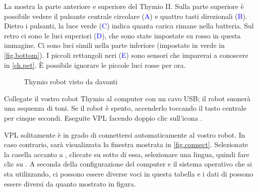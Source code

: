 
\label{ch.intro}


La  mostra la parte anteriore e superiore del Thymio II. Sulla parte superiore
è possibile vedere il pulsante centrale circolare (\textcolor{blue}{A}) e quattro tasti direzionali (\textcolor{blue}{B}).
Dietro i pulsanti, la luce verde (\textcolor{blue}{C}) indica quanta carica rimane nella
batteria. Sul retro ci sono le luci superiori (\textcolor{blue}{D}), che sono state impostate su rosso in questa immagine.
Ci sono luci simili nella parte inferiore (impostate in verde in \cref{fig.bottom}).
I piccoli rettangoli neri (\textcolor{blue}{E}) sono sensori che
imparerai a conoscere in \cref{ch.pet}. È possibile ignorare le piccole
luci rosse per ora.

\begin{figure}[h]
\begin{center}
\caption{Thymio robot visto da davanti}\label{fig.front}
\end{center}
\end{figure}

\pagebreak


Collegate il vostro robot Thymio al computer con un cavo USB; il robot suonerà una sequenza di toni.
Se il robot è spento, accenderlo toccando il tasto centrale
per cinque secondi. Eseguite VPL facendo doppio clic sull'icona
.



VPL solitamente è in grado di connettersi automaticamente al vostro robot.
In caso contrario, sarà
visualizzata la finestra mostrata in \cref{fig.connect}. Selezionate la casella accanto a , cliccate su  sotto di essa, selezionare una lingua, quindi fare clic su
.
A seconda della configurazione del computer
e il sistema operativo che si sta utilizzando, ci possono essere diverse
voci in questa tabella e i dati di  possono essere
diversi da quanto mostrato in figura.


